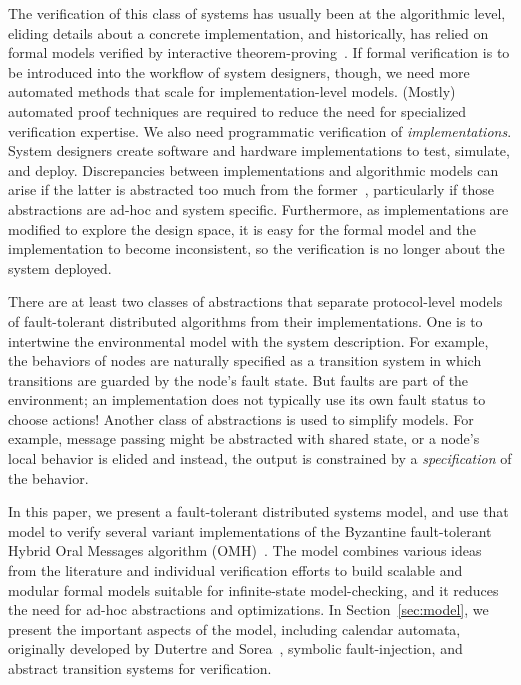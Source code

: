\documentclass{llncs/llncs}
\newcommand{\OMH}{\ensuremath{\mathrm{OMH}}\xspace}
\begin{document}
The verification of this class of systems has usually been at the algorithmic level, eliding details about a concrete implementation, and historically, has relied on formal models verified by interactive theorem-proving~\cite{om-acl2-impl,Young97:IC,Lincoln-Rushby,pvs}. If formal verification is to be introduced into the workflow of system designers, though, we need more automated methods that scale for implementation-level models. (Mostly) automated proof techniques are required to reduce the need for specialized verification expertise. We also need programmatic verification of \emph{implementations}. System designers create software and hardware implementations to test, simulate, and deploy. Discrepancies between implementations and algorithmic models can arise if the latter is abstracted too much from the former~\cite{paxos}, particularly if those abstractions are ad-hoc and system specific. Furthermore, as implementations are modified to explore the design space, it is easy for the formal model and the implementation to become inconsistent, so the verification is no longer about the system deployed.

There are at least two classes of abstractions that separate protocol-level models of fault-tolerant distributed algorithms from their implementations.  One is to intertwine the environmental model with the system description. For example, the behaviors of nodes are naturally specified as a transition system in which transitions are guarded by the node's fault state. But faults are part of the environment; an implementation does not typically use its own fault status to choose actions! Another class of abstractions is used to simplify models.  For example, message passing might be abstracted with shared state, or a node's local behavior is elided and instead, the output is constrained by a \emph{specification} of the behavior.

In this paper, we present a fault-tolerant distributed systems model, and use that model to verify several variant implementations of the Byzantine fault-tolerant Hybrid Oral Messages algorithm (\OMH)~\cite{Lincoln-Rushby}. The model combines various ideas from the literature and individual verification efforts to build scalable and modular formal models suitable for infinite-state model-checking, and it reduces the need for ad-hoc abstractions and optimizations. In Section~\ref{sec:model}, we present the important aspects of the model, including calendar automata, originally developed by Dutertre and Sorea~\cite{cal}, symbolic fault-injection, and abstract transition systems for verification.
\end{document}
